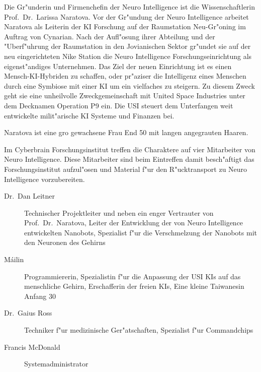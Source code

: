 \renewcommand{\ml}{\pinyin{Mailin2}}


Die Gr"underin und Firmenchefin der Neuro Intelligence ist die Wissenschaftlerin Prof.~Dr.~Larissa Naratova. Vor der Gr"undung der Neuro Intelligence arbeitet Naratova als Leiterin der KI Forschung auf der Raumstation Neu-Gr"oning im Auftrag von Cynarian. Nach der Aufl"osung ihrer Abteilung und der "Uberf"uhrung der Raumstation in den Jovianischen Sektor gr"undet sie auf der neu eingerichteten Nike Station die Neuro Intelligence Forschungseinrichtung als eigenst"andiges Unternehmen. Das Ziel der neuen Einrichtung ist es einen Mensch-KI-Hybriden zu schaffen, oder pr"aziser die Intelligenz eines Menschen durch eine Symbiose mit einer KI um ein vielfaches zu steigern. Zu diesem Zweck  geht sie eine unheilvolle Zweckgemeinschaft mit United Space Industries unter dem Decknamen Operation P9 ein. Die USI steuert dem Unterfangen weit entwickelte milit"arische KI Systeme und Finanzen bei.

Naratova ist eine gro\3 gewachsene Frau End 50 mit langen angegrauten Haaren. 


Im Cyberbrain Forschungsinstitut treffen die Charaktere auf vier Mitarbeiter von Neuro Intelligence. Diese Mitarbeiter sind beim Eintreffen damit besch"aftigt das Forschungsinstitut aufzul"osen und Material f"ur den R"ucktransport zu Neuro Intelligence vorzubereiten.

\begin{description}
    \item[Dr.~Dan Leitner] Technischer Projektleiter und neben \ml{} ein enger Vertrauter von Prof.~Dr.~Naratova, Leiter der Entwicklung 
        der von Neuro Intelligence entwickelten Nanobots, Spezialist f"ur die Verschmelzung  der  Nanobots mit den Neuronen des Gehirns
    \item[M\'{a}ilin] Programmiererin, Spezialistin f"ur die Anpassung der USI KIs auf das menschliche Gehirn, Erschafferin der freien KIs, 
        Eine kleine Taiwanesin Anfang 30
    \item[Dr.~Gaius Ross] Techniker f"ur medizinische Ger"atschaften, Spezialist f"ur Commandchips
    \item[Francis McDonald] Systemadministrator
\end{description}
\vfill\newpage

